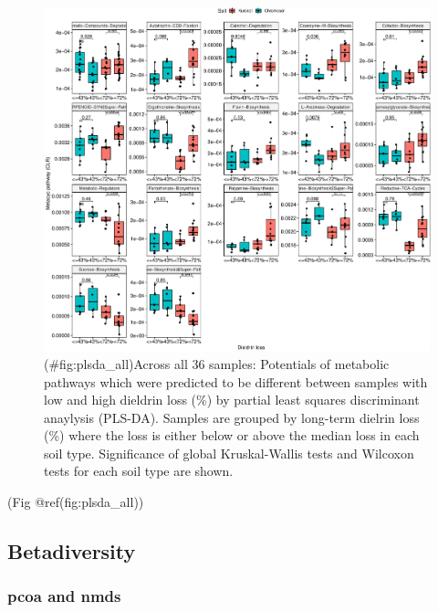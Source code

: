 \documentclass[
]{article}
\begin{document}
\begin{figure}
\centering
\includegraphics{M2_Results_files/figure-latex/plsda_all-1.pdf}
\caption{(\#fig:plsda\_all)Across all 36 samples: Potentials of metabolic pathways which were predicted to be different between samples with low and high dieldrin loss (\%) by partial least squares discriminant anaylysis (PLS-DA). Samples are grouped by long-term dielrin loss (\%) where the loss is either below or above the median loss in each soil type. Significance of global Kruskal-Wallis tests and Wilcoxon tests for each soil type are shown.}
\end{figure}

(Fig @ref(fig:plsda\_all))

\hypertarget{betadiversity}{%
\subsection{Betadiversity}\label{betadiversity}}

\hypertarget{pcoa-and-nmds}{%
\subsubsection{pcoa and nmds}\label{pcoa-and-nmds}}
\end{document}
